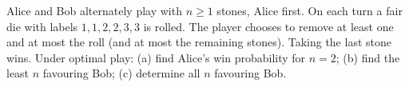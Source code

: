 Alice and Bob alternately play with $n\ge1$ stones, Alice first. On each turn a fair die with labels $1,1,2,2,3,3$ is rolled. The player chooses to remove at least one and at most the roll (and at most the remaining stones). Taking the last stone wins. Under optimal play: (a) find Alice's win probability for $n=2$; (b) find the least $n$ favouring Bob; (c) determine all $n$ favouring Bob.
